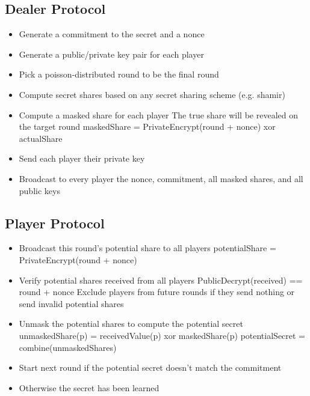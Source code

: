 \documentclass{article}
\begin{document}
\subsection{Dealer Protocol}
\begin{itemize}
	\item Generate a commitment to the secret and a nonce
	\item Generate a public/private key pair for each player
	\item Pick a poisson-distributed round to be the final round
	\item Compute secret shares based on any secret sharing scheme (e.g. shamir)
	\item Compute a masked share for each player 
	\subitem The true share will be revealed on the target round
	\subitem maskedShare = PrivateEncrypt(round + nonce) xor actualShare
	\item Send each player their private key
	\item Broadcast to every player the nonce, commitment, all masked shares, and all public keys
\end{itemize}
\subsection{Player Protocol}
\begin{itemize}
	\item Broadcast this round's potential share to all players
	\subitem potentialShare = PrivateEncrypt(round + nonce)
	\item Verify potential shares received from all players
	\subitem PublicDecrypt(received) == round + nonce
	\subitem Exclude players from future rounds if they send nothing or send invalid potential shares
	\item Unmask the potential shares to compute the potential secret
	\subitem unmaskedShare(p) = receivedValue(p) xor maskedShare(p)
	\subitem potentialSecret = combine(unmaskedShares)
	\item Start next round if the potential secret doesn't match the commitment
	\item Otherwise the secret has been learned
\end{itemize}
\end{document}
